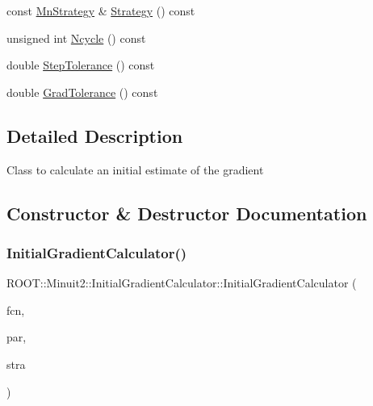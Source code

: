 \begin{DoxyCompactItemize}
\item 
const \mbox{\hyperlink{classROOT_1_1Minuit2_1_1MnStrategy}{Mn\+Strategy}} \& \mbox{\hyperlink{classROOT_1_1Minuit2_1_1InitialGradientCalculator_ac8fb719893c5d2959ba9d784c8c2e887}{Strategy}} () const
\item 
unsigned int \mbox{\hyperlink{classROOT_1_1Minuit2_1_1InitialGradientCalculator_aef8f53869854439865a45497e011a41c}{Ncycle}} () const
\item 
double \mbox{\hyperlink{classROOT_1_1Minuit2_1_1InitialGradientCalculator_afc3c2d01aedfca1ca5ba35d231f9916d}{Step\+Tolerance}} () const
\item 
double \mbox{\hyperlink{classROOT_1_1Minuit2_1_1InitialGradientCalculator_aac6cfb88ce499207d304fdaf404b4f7d}{Grad\+Tolerance}} () const
\end{DoxyCompactItemize}


\subsection{Detailed Description}
Class to calculate an initial estimate of the gradient 

\subsection{Constructor \& Destructor Documentation}
\mbox{\label{classROOT_1_1Minuit2_1_1InitialGradientCalculator_a25d1c68548c1ada8fa395a3c684a61ec}} 
\subsubsection{\texorpdfstring{InitialGradientCalculator()}{InitialGradientCalculator()}\hspace{0.1cm}{\footnotesize\ttfamily [1/2]}}
{\footnotesize\ttfamily R\+O\+O\+T\+::\+Minuit2\+::\+Initial\+Gradient\+Calculator\+::\+Initial\+Gradient\+Calculator (\begin{DoxyParamCaption}\item[{const \mbox{\hyperlink{classROOT_1_1Minuit2_1_1MnFcn}{Mn\+Fcn}} \&}]{fcn,  }\item[{const \mbox{\hyperlink{classROOT_1_1Minuit2_1_1MnUserTransformation}{Mn\+User\+Transformation}} \&}]{par,  }\item[{const \mbox{\hyperlink{classROOT_1_1Minuit2_1_1MnStrategy}{Mn\+Strategy}} \&}]{stra }\end{DoxyParamCaption})\hspace{0.3cm}{\ttfamily [inline]}}

